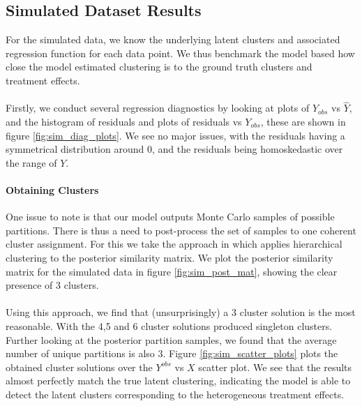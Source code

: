 \documentclass{article}
\begin{document}
\subsection{Simulated Dataset Results} 
For the simulated data, we know the underlying latent clusters and associated regression function for each data point. We thus benchmark the model based how close the model estimated clustering is to the ground truth clusters and treatment effects.
\\ \\
Firstly, we conduct several regression diagnostics by looking at plots of $Y_{obs}$ vs $\hat{Y}$, and the histogram of residuals and plots of residuals vs $Y_{obs}$, these are shown in figure \ref{fig:sim_diag_plots}. We see no major issues, with the residuals having a symmetrical distribution around 0, and the residuals being homoskedastic over the range of $Y$.
\paragraph{Obtaining Clusters} One issue to note is that our model outputs Monte Carlo samples of possible partitions. There is thus a need to post-process the set of samples to one coherent cluster assignment. For this we take the approach in \cite{medvedovic2004bayesian} which applies hierarchical clustering to the posterior similarity matrix. We plot the posterior similarity matrix for the simulated data in figure \ref{fig:sim_post_mat}, showing the clear presence of 3 clusters. 
\\ \\
Using this approach, we find that (unsurprisingly) a 3 cluster solution is the most reasonable. With the 4,5 and 6 cluster solutions produced singleton clusters. Further looking at the posterior partition samples, we found that the average number of unique partitions is also 3. Figure \ref{fig:sim_scatter_plots} plots the obtained cluster solutions over the $Y^{obs}$ vs $X$ scatter plot. We see that the results almost perfectly match the true latent clustering, indicating the model is able to detect the latent clusters corresponding to the heterogeneous treatment effects. 
\end{document}
